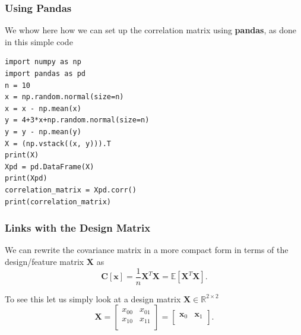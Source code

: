 \documentclass{beamer}
\begin{document}
\begin{frame}
\frametitle{Using Pandas}

We whow here how we can set up the correlation matrix using \textbf{pandas}, as done in this simple code














\begin{verbatim}
import numpy as np
import pandas as pd
n = 10
x = np.random.normal(size=n)
x = x - np.mean(x)
y = 4+3*x+np.random.normal(size=n)
y = y - np.mean(y)
X = (np.vstack((x, y))).T
print(X)
Xpd = pd.DataFrame(X)
print(Xpd)
correlation_matrix = Xpd.corr()
print(correlation_matrix)

\end{verbatim}
\end{frame}

\begin{frame}
\frametitle{Links with the Design Matrix}

We can rewrite the covariance matrix in a more compact form in terms of the design/feature matrix $\bm{X}$ as 
\[
\bm{C}[\bm{x}] = \frac{1}{n}\bm{X}^T\bm{X}= \mathbb{E}[\bm{X}^T\bm{X}].
\]

To see this let us simply look at a design matrix $\bm{X}\in {\mathbb{R}}^{2\times 2}$
\[
\bm{X}=\begin{bmatrix}
x_{00} & x_{01}\\
x_{10} & x_{11}\\
\end{bmatrix}=\begin{bmatrix}
\bm{x}_{0} & \bm{x}_{1}\\
\end{bmatrix}.
\]
\end{frame}
\end{document}
